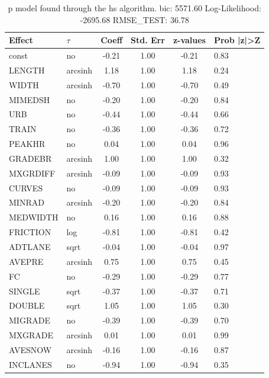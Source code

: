 \begin{table}
	\caption{p model found through the hs algorithm. bic: 5571.60 Log-Likelihood: -2695.68 RMSE_TEST: 36.78}
	\begin{center}
		\begin{tabular}{|l|l|c|c|c|l|}
			\hline
			Effect & $\tau$ & Coeff & Std. Err & z-values & Prob |z|>Z \\
			\hline
			const & no & -0.21 & 1.00 & -0.21 & 0.83 \\
			\hline
			LENGTH & arcsinh & 1.18 & 1.00 & 1.18 & 0.24 \\
			\hline
			WIDTH & arcsinh & -0.70 & 1.00 & -0.70 & 0.49 \\
			\hline
			MIMEDSH & no & -0.20 & 1.00 & -0.20 & 0.84 \\
			\hline
			URB & no & -0.44 & 1.00 & -0.44 & 0.66 \\
			\hline
			TRAIN & no & -0.36 & 1.00 & -0.36 & 0.72 \\
			\hline
			PEAKHR & no & 0.04 & 1.00 & 0.04 & 0.96 \\
			\hline
			GRADEBR & arcsinh & 1.00 & 1.00 & 1.00 & 0.32 \\
			\hline
			MXGRDIFF & arcsinh & -0.09 & 1.00 & -0.09 & 0.93 \\
			\hline
			CURVES & no & -0.09 & 1.00 & -0.09 & 0.93 \\
			\hline
			MINRAD & arcsinh & -0.20 & 1.00 & -0.20 & 0.84 \\
			\hline
			MEDWIDTH & no & 0.16 & 1.00 & 0.16 & 0.88 \\
			\hline
			FRICTION & log & -0.81 & 1.00 & -0.81 & 0.42 \\
			\hline
			ADTLANE & sqrt & -0.04 & 1.00 & -0.04 & 0.97 \\
			\hline
			AVEPRE & arcsinh & 0.75 & 1.00 & 0.75 & 0.45 \\
			\hline
			FC & no & -0.29 & 1.00 & -0.29 & 0.77 \\
			\hline
			SINGLE & sqrt & -0.37 & 1.00 & -0.37 & 0.71 \\
			\hline
			DOUBLE & sqrt & 1.05 & 1.00 & 1.05 & 0.30 \\
			\hline
			MIGRADE & no & -0.39 & 1.00 & -0.39 & 0.70 \\
			\hline
			MXGRADE & arcsinh & 0.01 & 1.00 & 0.01 & 0.99 \\
			\hline
			AVESNOW & arcsinh & -0.16 & 1.00 & -0.16 & 0.87 \\
			\hline
			INCLANES & no & -0.94 & 1.00 & -0.94 & 0.35 \\
			\hline

\end{tabular}
\end{center}
\end{table}
